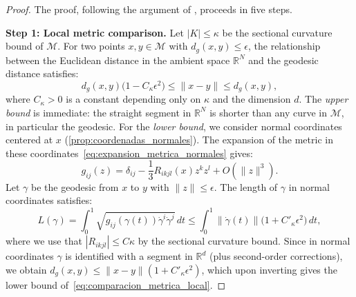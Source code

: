 \begin{proof}
	The proof, following the argument of \citet{bernstein2000graph}, proceeds in five steps.

	\textbf{Step 1: Local metric comparison.}
	Let $|K| \leq \kappa$ be the sectional curvature bound of $\mathcal{M}$. For two points $x, y \in \mathcal{M}$ with $d_g(x, y) \leq \epsilon$, the relationship between the Euclidean distance in the ambient space $\mathbb{R}^N$ and the geodesic distance satisfies:
	\begin{equation}\label{eq:comparacion_metrica_local}
	d_g(x,y)\bigl(1 - C_\kappa \epsilon^2\bigr) \leq \|x - y\| \leq d_g(x,y),
	\end{equation}
	where $C_\kappa > 0$ is a constant depending only on $\kappa$ and the dimension $d$. The \emph{upper bound} is immediate: the straight segment in $\mathbb{R}^N$ is shorter than any curve in $\mathcal{M}$, in particular the geodesic. For the \emph{lower bound}, we consider normal coordinates centered at $x$ (\autoref{prop:coordenadas_normales}). The expansion of the metric in these coordinates~\eqref{eq:expansion_metrica_normales} gives:
	\[
	g_{ij}(z) = \delta_{ij} - \frac{1}{3} R_{ikjl}(x) z^k z^l + O(\|z\|^3).
	\]
	Let $\gamma$ be the geodesic from $x$ to $y$ with $\|z\| \leq \epsilon$. The length of $\gamma$ in normal coordinates satisfies:
	\[
	L(\gamma) = \int_0^1 \sqrt{g_{ij}(\gamma(t))\dot{\gamma}^i\dot{\gamma}^j} \, dt \leq \int_0^1 \|\dot{\gamma}(t)\|\bigl(1 + C'_\kappa \epsilon^2\bigr) \, dt,
	\]
	where we use that $|R_{ikjl}| \leq C\kappa$ by the sectional curvature bound. Since in normal coordinates $\gamma$ is identified with a segment in $\mathbb{R}^d$ (plus second-order corrections), we obtain $d_g(x,y) \leq \|x - y\|(1 + C'_\kappa \epsilon^2)$, which upon inverting gives the lower bound of~\eqref{eq:comparacion_metrica_local}.


\end{proof}
